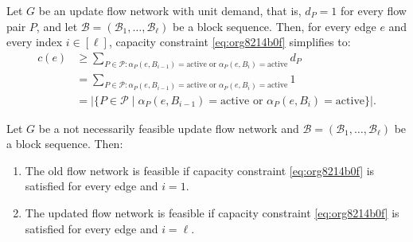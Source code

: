 \documentclass[fontsize=11pt,paper=a4]{book}
\begin{document}
\begin{remark}
Let \(G\) be an update flow network with unit demand, that is, \(d_P=1\) for every flow pair \(P\), and let \(\mathcal{B}=(\mathscr{B}_1,\dots,\mathscr{B}_{\ell})\) be a block sequence.
Then, for every edge \(e\) and every index \(i\in[\ell]\), capacity constraint \ref{eq:org8214b0f} simplifies to:
\begin{align*}
c(e)
&\geq\sum_{P\in\mathcal{P}:\alpha_P(e,B_{i-1})=\mathrm{active}\text{ or }\alpha_P(e,B_i)=\mathrm{active}}d_P\\
&=\sum_{P\in\mathcal{P}:\alpha_P(e,B_{i-1})=\mathrm{active}\text{ or }\alpha_P(e,B_i)=\mathrm{active}}1\\
&=\lvert\{P\in\mathcal{P}\mid\alpha_P(e,B_{i-1})=\mathrm{active}\text{ or }\alpha_P(e,B_i)=\mathrm{active}\}\rvert.
\end{align*}
\label{org4411b52}
\end{remark}

\begin{lem}
Let \(G\) be a not necessarily feasible update flow network and \(\mathcal{B}=(\mathscr{B}_1,\dots,\mathscr{B}_{\ell})\) be a block sequence. Then:

\begin{enumerate}
\item \label{itm:lem-update-flow-network-feasible-if-1}
The old flow network is feasible if capacity constraint \ref{eq:org8214b0f} is satisfied for every edge and \(i=1\).

\item \label{itm:lem-update-flow-network-feasible-if-2}
The updated flow network is feasible if capacity constraint \ref{eq:org8214b0f} is satisfied for every edge and \(i=\ell\).
\end{enumerate}
\label{org1280734}
\end{lem}
\end{document}
